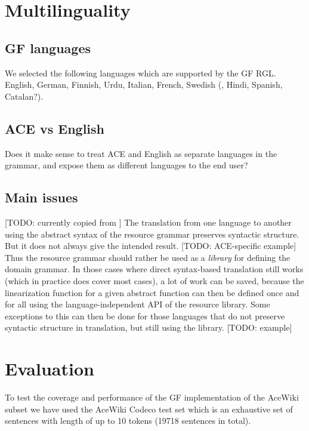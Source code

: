 \documentclass[a4paper]{article}
\begin{document}
\section{Multilinguality}

\subsection{GF languages}

We selected the following languages which are supported by the GF RGL.
English, German, Finnish, Urdu, Italian, French, Swedish
(, Hindi, Spanish, Catalan?).

\subsection{ACE vs English}

Does it make sense to treat ACE and English as separate languages in the
grammar, and expose them as different languages to the end user?

\subsection{Main issues}

[TODO: currently copied from \cite{ranta:cnl2009_revised}]
The translation from one language to another using the abstract syntax of the
resource grammar preserves syntactic structure. But it does not always give
the intended result. [TODO: ACE-specific example]
Thus the resource grammar should rather be used as a \emph{library} for
defining the domain grammar. In those cases where direct syntax-based
translation still works (which in practice does cover most cases), a lot of
work can be saved, because the linearization function for a given abstract
function can then be defined once and for all using the language-independent
API of the resource library. Some exceptions to this can then be done for
those languages that do not preserve syntactic structure in translation,
but still using the library. [TODO: example]

\section{Evaluation}

To test the coverage and performance of the GF implementation of the
AceWiki subset we have used
the AceWiki Codeco test set which
is an exhaustive set of sentences with length of up to 10 tokens
(19718 sentences in total).
\end{document}
